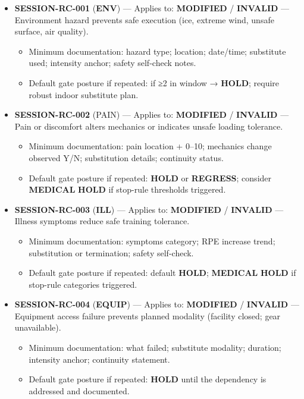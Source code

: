 \documentclass[10pt]{article}
\begin{document}
\begin{itemize}
\item \textbf{SESSION-RC-001} (\textbf{ENV}) — Applies to: \textbf{MODIFIED} / \textbf{INVALID} — Environment hazard prevents safe execution (ice, extreme wind, unsafe surface, air quality).
\begin{itemize}
\item Minimum documentation: hazard type; location; date/time; substitute used; intensity anchor; safety self-check notes.
\item Default gate posture if repeated: if ≥2 in window → \textbf{HOLD}; require robust indoor substitute plan.
\end{itemize}
\item \textbf{SESSION-RC-002} (PAIN) — Applies to: \textbf{MODIFIED} / \textbf{INVALID} — Pain or discomfort alters mechanics or indicates unsafe loading tolerance.
\begin{itemize}
\item Minimum documentation: pain location + 0–10; mechanics change observed Y/N; substitution details; continuity status.
\item Default gate posture if repeated: \textbf{HOLD} or \textbf{REGRESS}; consider \textbf{MEDICAL} \textbf{HOLD} if stop-rule thresholds triggered.
\end{itemize}
\item \textbf{SESSION-RC-003} (\textbf{ILL}) — Applies to: \textbf{MODIFIED} / \textbf{INVALID} — Illness symptoms reduce safe training tolerance.
\begin{itemize}
\item Minimum documentation: symptoms category; RPE increase trend; substitution or termination; safety self-check.
\item Default gate posture if repeated: default \textbf{HOLD}; \textbf{MEDICAL} \textbf{HOLD} if stop-rule categories triggered.
\end{itemize}
\item \textbf{SESSION-RC-004} (\textbf{EQUIP}) — Applies to: \textbf{MODIFIED} / \textbf{INVALID} — Equipment access failure prevents planned modality (facility closed; gear unavailable).
\begin{itemize}
\item Minimum documentation: what failed; substitute modality; duration; intensity anchor; continuity statement.
\item Default gate posture if repeated: \textbf{HOLD} until the dependency is addressed and documented.
\end{itemize}

\end{itemize}
\end{document}
